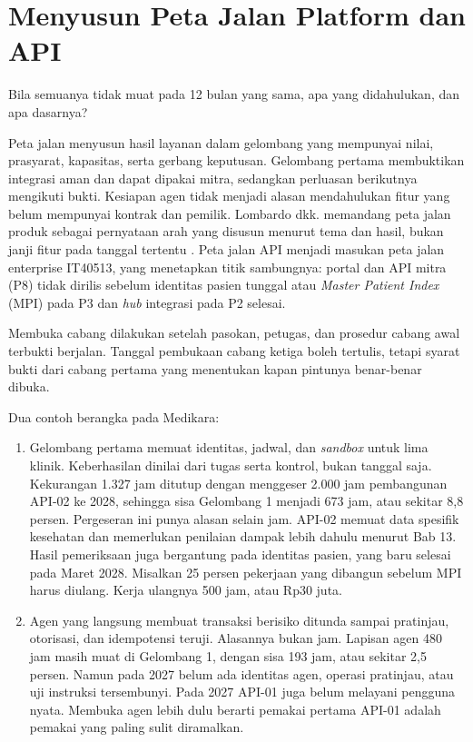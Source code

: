 \section{Menyusun Peta Jalan Platform dan API}

Bila semuanya tidak muat pada 12 bulan yang sama, apa yang didahulukan, dan apa dasarnya?

Peta jalan menyusun hasil layanan dalam gelombang yang mempunyai nilai, prasyarat, kapasitas, serta gerbang keputusan. Gelombang pertama membuktikan integrasi aman dan dapat dipakai mitra, sedangkan perluasan berikutnya mengikuti bukti. Kesiapan agen tidak menjadi alasan mendahulukan fitur yang belum mempunyai kontrak dan pemilik.
Lombardo dkk. memandang peta jalan produk sebagai pernyataan arah yang disusun menurut tema dan hasil, bukan janji fitur pada tanggal tertentu \cite{c14-lombardo2017}. Peta jalan API menjadi masukan peta jalan enterprise IT40513, yang menetapkan titik sambungnya: portal dan API mitra (P8) tidak dirilis sebelum identitas pasien tunggal atau \textit{Master Patient Index}
(MPI) pada P3 dan \textit{hub} integrasi pada P2 selesai.

Membuka cabang dilakukan setelah pasokan, petugas, dan prosedur cabang awal terbukti berjalan. Tanggal pembukaan cabang ketiga boleh tertulis, tetapi syarat bukti dari cabang pertama yang menentukan kapan pintunya benar-benar dibuka.

Dua contoh berangka pada Medikara:
\begin{enumerate}
  \item Gelombang pertama memuat identitas, jadwal, dan \textit{sandbox} untuk lima klinik. Keberhasilan dinilai dari tugas serta kontrol, bukan tanggal saja. Kekurangan 1.327 jam ditutup dengan menggeser 2.000 jam pembangunan API-02 ke 2028, sehingga sisa Gelombang 1 menjadi 673 jam, atau sekitar 8,8 persen. Pergeseran ini punya alasan selain jam. API-02 memuat data
        spesifik kesehatan dan memerlukan penilaian dampak lebih dahulu menurut Bab 13. Hasil pemeriksaan juga bergantung pada identitas pasien, yang baru selesai pada Maret 2028. Misalkan 25 persen pekerjaan yang dibangun sebelum MPI harus diulang. Kerja ulangnya 500 jam, atau Rp30 juta.
  \item Agen yang langsung membuat transaksi berisiko ditunda sampai pratinjau, otorisasi, dan idempotensi teruji. Alasannya bukan jam. Lapisan agen 480 jam masih muat di Gelombang 1, dengan sisa 193 jam, atau sekitar 2,5 persen. Namun pada 2027 belum ada identitas agen, operasi pratinjau, atau uji instruksi tersembunyi. Pada 2027 API-01 juga belum melayani pengguna
        nyata. Membuka agen lebih dulu berarti pemakai pertama API-01 adalah pemakai yang paling sulit diramalkan.
\end{enumerate}

